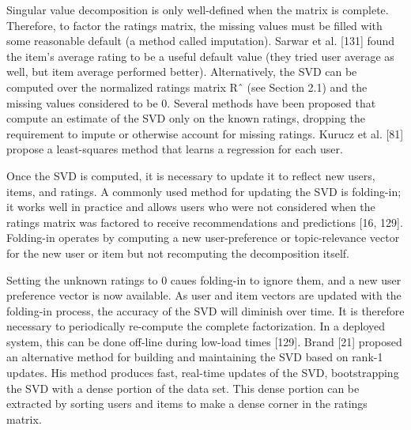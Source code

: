 Singular value decomposition is only well-defined when the matrix
is complete. Therefore, to factor the ratings matrix, the missing values
must be filled with some reasonable default (a method called imputation).
Sarwar et al. [131] found the item’s average rating to be a
useful default value (they tried user average as well, but item average
performed better). Alternatively, the SVD can be computed over the
normalized ratings matrix Rˆ (see Section 2.1) and the missing values
considered to be 0.
Several methods have been proposed that compute an estimate
of the SVD only on the known ratings, dropping the requirement to
impute or otherwise account for missing ratings. Kurucz et al. [81]
propose a least-squares method that learns a regression for each user.

Once the SVD is computed, it is necessary to update it to reflect
new users, items, and ratings. A commonly used method for updating
the SVD is folding-in; it works well in practice and allows users who
were not considered when the ratings matrix was factored to receive
recommendations and predictions [16, 129]. Folding-in operates by computing
a new user-preference or topic-relevance vector for the new user
or item but not recomputing the decomposition itself. 

Setting the unknown ratings to 0 caues folding-in to ignore them, and a new user preference vector is now available. As user and item vectors are updated with the folding-in process, the
accuracy of the SVD will diminish over time. It is therefore necessary
to periodically re-compute the complete factorization. In a deployed
system, this can be done off-line during low-load times [129].
Brand [21] proposed an alternative method for building and maintaining
the SVD based on rank-1 updates. His method produces fast,
real-time updates of the SVD, bootstrapping the SVD with a dense
portion of the data set. This dense portion can be extracted by sorting
users and items to make a dense corner in the ratings matrix.


